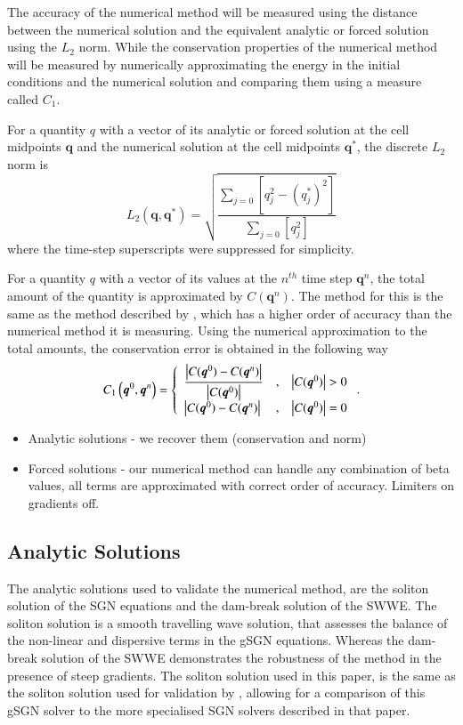 \documentclass[10pt]{elsarticle}
\newcommand\T{\rule{0pt}{3ex }}       %
\newcommand{\vecn}[1]{\boldsymbol{#1}}
\begin{document}
The accuracy of the numerical method will be measured using the distance between the numerical solution and the equivalent analytic or forced solution using the $L_2$ norm. While the conservation properties of the numerical method will be measured by numerically approximating the energy in the initial conditions and the numerical solution and comparing them using a measure called $C_1$.

For a quantity $q$ with a vector of its analytic or forced solution at the cell midpoints $\vecn{q}$ and the numerical solution at the cell midpoints $\vecn{q}^*$, the discrete $L_2$ norm is
\begin{equation}
\label{eqn:Conv_Error}
L_2\left(\vecn{q},\vecn{q}^*\right) = \sqrt{ \dfrac{\sum_{j = 0}  \left[q_j^2 - \left(q^*_j\right)^2 \right]}{\sum_{j = 0}  \left[q_j^2 \right]}}
\end{equation}
where the time-step superscripts were suppressed for simplicity.

For a quantity $q$ with a vector of its values at the $n^{th}$ time step $\vecn{q}^n$, the total amount of the quantity is approximated by $C(\vecn{q}^n)$. The method for this is the same as the method described by \citet{Zoppou-etal-2017}, which has a higher order of accuracy than the numerical method it is measuring. Using the numerical approximation to the total amounts, the conservation error is obtained in the following way
\begin{equation}
\label{eqn:Cons_Error}
C_1\left(\vecn{q}^0,\vecn{q}^n\right) = \left \lbrace \begin{array}{l c r}
\dfrac{\left | C(\vecn{q}^0) - C(\vecn{q}^n) \right |}{\left| C(\vecn{q}^0) \right|}&,& \left| C(\vecn{q}^0) \right| > 0 \T \\
\left | C(\vecn{q}^0) - C(\vecn{q}^n) \right |&,& \left| C(\vecn{q}^0) \right| = 0 
\end{array} \right. .
\end{equation}

\begin{itemize}
	\item Analytic solutions - we recover them (conservation and norm)
	\item Forced solutions - our numerical method can handle any combination of beta values, all terms are approximated with correct order of accuracy. Limiters on gradients off. 
\end{itemize}

\subsection{Analytic Solutions}
The analytic solutions used to validate the numerical method, are the soliton solution of the SGN equations and the dam-break solution of the SWWE. The soliton solution is a smooth travelling wave solution, that assesses the balance of the non-linear and dispersive terms in the gSGN equations. Whereas the dam-break solution of the SWWE demonstrates the robustness of the method in the presence of steep gradients. The soliton solution used in this paper, is the same as the soliton solution used for validation by \citet{Pitt-2019}, allowing for a comparison of this gSGN solver to the more specialised SGN solvers described in that paper. 
\end{document}
